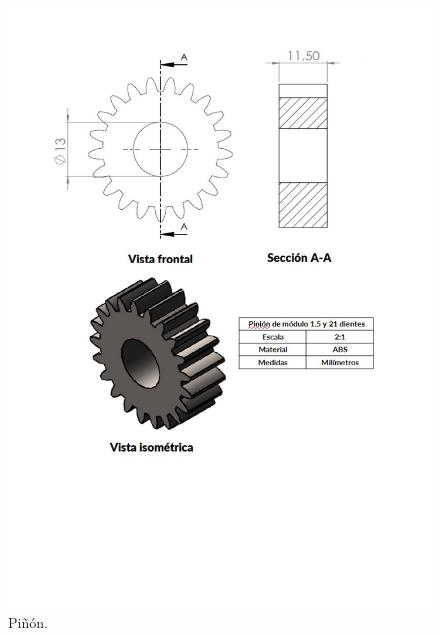 \documentclass{article}
\begin{document}
\begin{figure}[ht]
\centering
\includegraphics[width=\textwidth]{PlanoPinion.pdf}
\caption{Piñón.}
\end{figure}
\end{document}
